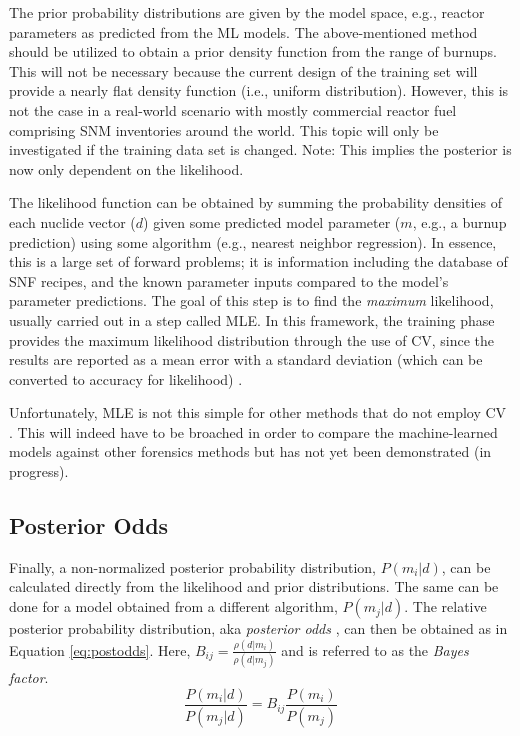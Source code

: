 The prior probability distributions are given by the model space, e.g., reactor
parameters as predicted from the \gls{ML} models.  The above-mentioned
method should be utilized to obtain a prior density function from the range of
burnups.  This will not be necessary because the current design of the training
set will provide a nearly flat density function (i.e., uniform distribution).
However, this is not the case in a real-world scenario with mostly commercial
reactor fuel comprising \gls{SNM} inventories around the world.  This topic
will only be investigated if the training data set is changed.
\cite{bayes_compare} Note: This implies the posterior is now only dependent on
the likelihood.

The likelihood function can be obtained by summing the probability densities of
each nuclide vector ($d$) given some predicted model parameter ($m$, e.g., a
burnup prediction) using some algorithm (e.g., nearest neighbor regression).
In essence, this is a large set of forward problems; it is information
including the database of \gls{SNF} recipes, and the known parameter inputs
compared to the model's parameter predictions.  The goal of this step is to
find the \textit{maximum} likelihood, usually carried out in a step called
\gls{MLE}. In this framework, the training phase provides the maximum
likelihood distribution through the use of \gls{CV}, since the results
are reported as a mean error with a standard deviation (which can be
converted to accuracy for likelihood) \cite{scikit}. 

Unfortunately, \gls{MLE} is not this simple for other methods that do not
employ \gls{CV} \cite{gentle_bayes, bayes_compare}. This will indeed
have to be broached in order to compare the machine-learned models against
other forensics methods but has not yet been demonstrated (in progress).

\subsection{Posterior Odds}

Finally, a non-normalized posterior probability distribution, $P(m_i|d)$, can
be calculated directly from the likelihood and prior distributions. The same
can be done for a model obtained from a different algorithm, $P(m_j|d)$. The
relative posterior probability distribution, aka \textit{posterior odds}
\cite{bayes_compare}, can then be obtained as in Equation \ref{eq:postodds}.
Here, $B_{ij} = \frac{\rho(d|m_i)}{\rho(d|m_j)}$ and is referred to as the
\textit{Bayes factor}.
\begin{equation}
\label{eq:postodds}
  \frac{P(m_i|d)}{P(m_j|d)} = B_{ij} \frac{P(m_i)}{P(m_j)}
\end{equation}

